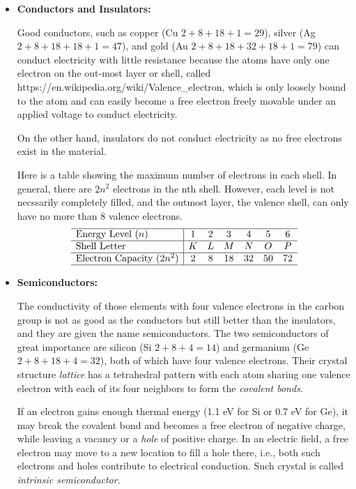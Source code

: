 \documentclass{article}
\begin{document}
\begin{itemize}
\item {\bf Conductors and Insulators:} 

Good conductors, such as copper (Cu $2+8+18+1=29$), silver (Ag $2+8+18+18+1=47$),
and gold (Au $2+8+18+32+18+1=79$) can conduct electricity with little resistance 
because the atoms have only one electron on the out-most layer or shell, called
{https://en.wikipedia.org/wiki/Valence_electron}, which is only loosely bound 
to the atom and can easily become a free electron freely movable under an applied
voltage to conduct electricity. 

On the other hand, insulators do not conduct electricity as no free electrons 
exist in the material.

Here is a table showing the maximum number of electrons in each shell.
In general, there are $2n^2$ electrons in the nth shell. However, each 
level is not necssarily completely filled, and the outmost layer, the 
valence shell, can only have no more than 8 valence electrons.
\begin{equation}
\begin{array}{l|cccccc} \hline
\mbox{Energy Level } (n) & 1 & 2 & 3 & 4 & 5 & 6 \\ \hline
\mbox{Shell Letter} & K & L & M & N & O & P  \\ \hline
\mbox{Electron Capacity } (2n^2) & 2 & 8 & 18 & 32 & 50 & 72 \\ \hline
\end{array}
\end{equation}


\item {\bf Semiconductors:} 

The conductivity of those elements with four valence electrons in the carbon 
group is not as good as the conductors but still better than the insulators, 
and they are given the name semiconductors. The two semiconductors of great 
importance are silicon (Si $2+8+4=14$) and germanium (Ge $2+8+18+4=32$), both 
of which have four valence electrons. Their crystal structure {\em lattice}
has a tetrahedral pattern with each atom sharing one valence electron with 
each of its four neighbors to form the {\em covalent bonds}. 

If an electron gains enough thermal energy (1.1 eV for Si or 0.7 eV for
Ge), it may break the covalent bond and becomes a free electron of negative
charge, while leaving a vacancy or a {\em hole} of positive charge. In an 
electric field, a free electron may move to a new location to fill a hole 
there, i.e., both such electrons and holes contribute to electrical conduction. 
Such crystal is called {\em intrinsic semiconductor}.


\end{itemize}
\end{document}
